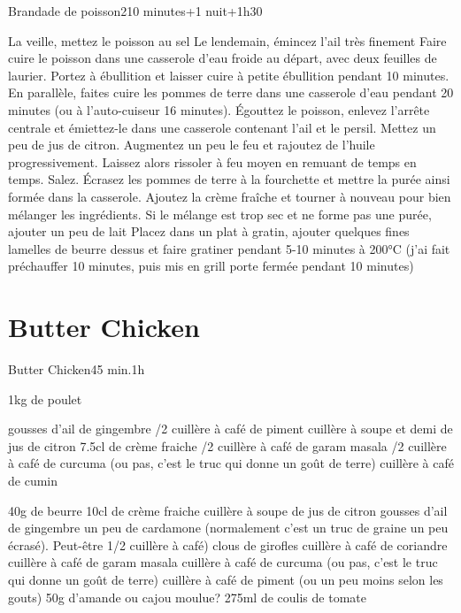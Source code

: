 {\begin{recette}{Brandade de poisson}{2}{10 minutes+1 nuit+1h30}{}
\begin{preparation}
\etape La veille, mettez le poisson au sel
\etape Le lendemain, émincez l'ail très finement 
\etape Faire cuire le poisson dans une casserole d'eau froide au départ, avec deux feuilles de laurier. Portez à ébullition et 
laisser 
cuire à petite ébullition pendant 10 minutes.
\etape En parallèle, faites cuire les pommes de terre dans une casserole d'eau pendant 20 minutes (ou à l'auto-cuiseur 16 
minutes).
\etape Égouttez le poisson, enlevez l'arrête centrale et émiettez-le dans une casserole contenant l'ail et le persil. Mettez un 
peu de jus de citron. Augmentez un peu le feu et rajoutez de l'huile progressivement. Laissez alors rissoler à feu moyen en 
remuant de temps en temps. Salez.
\etape Écrasez les pommes de terre à la fourchette et mettre la purée ainsi formée dans la casserole.
\etape Ajoutez la crème fraîche et tourner à nouveau pour bien mélanger les ingrédients. Si le mélange est trop sec et ne forme 
pas une purée, ajouter un peu de lait
\etape Placez dans un plat à gratin, ajouter quelques fines lamelles de beurre dessus et faire gratiner pendant 5-10 minutes à 
200°C (j'ai fait préchauffer 10 minutes, puis mis en grill porte fermée pendant 10 minutes)
\end{preparation}
\end{recette}

\section{Butter Chicken}
\begin{recette}{Butter Chicken}{}{45 min.}{1h}
\begin{ingredients}
\ingredient 1kg de poulet

 gousses d'ail
\ingredient 2cm de gingembre
/2 cuillère à café de piment
 cuillère à soupe et demi de jus de citron
\ingredient 7.5cl de crème fraiche
/2 cuillère à café de garam masala
/2 cuillère à café de curcuma (ou pas, c'est le truc qui donne un goût de terre)
 cuillère à café de cumin

\ingredient 40g de beurre
\ingredient 10cl de crème fraiche
 cuillère à soupe de jus de citron
 gousses d'ail
\ingredient 2cm de gingembre
\ingredient un peu de cardamone (normalement c'est un truc de graine un peu écrasé). Peut-être 1/2 cuillère à café)
 clous de girofles
 cuillère à café de coriandre
 cuillère à café de garam masala
 cuillère à café de curcuma (ou pas, c'est le truc qui donne un goût de terre)
 cuillère à café de piment (ou un peu moins selon les gouts)
\ingredient 50g d'amande ou cajou moulue?
\ingredient 275ml de coulis de tomate
\end{ingredients}


\end{recette}}
